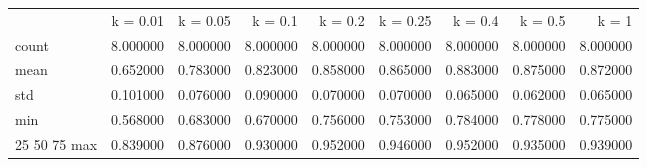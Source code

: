 \begin{tabular}{lrrrrrrrr}
 & k = 0.01 & k = 0.05 &  k = 0.1 & k = 0.2 & k = 0.25 & k = 0.4 & k = 0.5 & k = 1 \\
count & 8.000000 & 8.000000 & 8.000000 & 8.000000 & 8.000000 & 8.000000 & 8.000000 & 8.000000 \\
mean & 0.652000 & 0.783000 & 0.823000 & 0.858000 & 0.865000 & 0.883000 & 0.875000 & 0.872000 \\
std & 0.101000 & 0.076000 & 0.090000 & 0.070000 & 0.070000 & 0.065000 & 0.062000 & 0.065000 \\
min & 0.568000 & 0.683000 & 0.670000 & 0.756000 & 0.753000 & 0.784000 & 0.778000 & 0.775000 \\
25%
50%
75%
max & 0.839000 & 0.876000 & 0.930000 & 0.952000 & 0.946000 & 0.952000 & 0.935000 & 0.939000 \\
\end{tabular}
